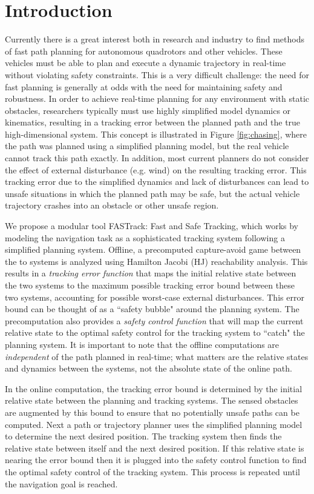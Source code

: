 \section{Introduction}
 Currently there is a great interest both in research and industry to find methods of fast path planning for autonomous quadrotors and other vehicles. These vehicles must be able to plan and execute a dynamic trajectory in real-time without violating safety constraints. This is a very difficult challenge: the need for fast planning is generally at odds with the need for maintaining safety and robustness. In order to achieve real-time planning for any environment with static obstacles, researchers typically must use highly simplified model dynamics or kinematics, resulting in a tracking error between the planned path and the true high-dimensional system. This concept is illustrated in Figure \ref{fig:chasing}, where the path was planned using a simplified planning model, but the real vehicle cannot track this path exactly. In addition, most current planners do not consider the effect of external disturbance (e.g. wind) on the resulting tracking error. This tracking error due to the simplified dynamics and lack of disturbances can lead to unsafe situations in which the planned path may be safe, but the actual vehicle trajectory crashes into an obstacle or other unsafe region.

We propose a modular tool FASTrack: Fast and Safe Tracking, which works by modeling the navigation task as a sophisticated tracking system following a simplified planning system. Offline, a precomputed capture-avoid game between the to systems is analyzed using Hamilton Jacobi (HJ) reachability analysis. This results in a \textit{tracking error function} that maps the initial relative state between the two systems to the maximum possible tracking error bound between these two systems, accounting for possible worst-case external disturbances. This error bound can be thought of as a ``safety bubble" around the planning system. The precomputation also provides a \textit{safety control function} that will map the current relative state to the optimal safety control for the tracking system to ``catch" the planning system. It is important to note that the offline computations are \textit{independent} of the path planned in real-time; what matters are the relative states and dynamics between the systems, not the absolute state of the online path.

In the online computation, the tracking error bound is determined by the initial relative state between the planning and tracking systems. The sensed obstacles are augmented by this bound to ensure that no potentially unsafe paths can be computed. Next a path or trajectory planner uses the simplified planning model to determine the next desired position. The tracking system then finds the relative state between itself and the next desired position. If this relative state is nearing the error bound then it is plugged into the safety control function to find the optimal safety control of the tracking system. This process is repeated until the navigation goal is reached. 
  

